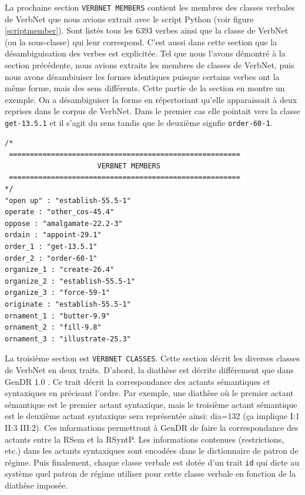 La prochaine section \texttt{VERBNET MEMBERS} contient les membres des classes verbales de VerbNet que nous avions extrait avec le script Python (voir figure \ref{scriptmember}). Sont listés tous les 6393 verbes ainsi que la classe de VerbNet (ou la sous-classe) qui leur correspond. C'est aussi dans cette section que la désambiguisation des verbes est explicitée. Tel que nous l'avons démontré à la section précédente, nous avions extraits les membres de classes de VerbNet, puis nous avons désambiuiser les formes identiques puisque certains verbes ont la même forme, mais des sens différents. Cette partie de la section en montre un exemple. On a désambiguiser la forme  en répertoriant qu'elle apparaissait à deux reprises dans le corpus de VerbNet. Dans le premier cas elle pointait vers la classe \texttt{get-13.5.1} et il s'agit du sens  tandis que le deuxième signfie  \texttt{order-60-1}.

\begin{lstlisting}[language=XML, caption = Partie membre du lexicon]
/*
 =======================================================
                      VERBNET MEMBERS
 =======================================================
*/
"open up" : "establish-55.5-1"
operate : "other_cos-45.4"
oppose : "amalgamate-22.2-3"
ordain : "appoint-29.1"
order_1 : "get-13.5.1"
order_2 : "order-60-1"
organize_1 : "create-26.4"
organize_2 : "establish-55.5-1"
organize_3 : "force-59-1"
originate : "establish-55.5-1"
ornament_1 : "butter-9.9"
ornament_2 : "fill-9.8"
ornament_3 : "illustrate-25.3"
\end{lstlisting}

La troisième section est \texttt{VERBNET CLASSES}. Cette section décrit les diverses classes de VerbNet en deux traits. D'abord, la diathèse est décrite différement que dans GenDR 1.0 . Ce trait décrit la correspondance des actants sémantiques et syntaxiques en précisant l'ordre. Par exemple, une diathèse où le premier actant sémantique est le premier actant syntaxique, mais le troisième actant sémantique est le deuxième actant syntaxique sera représentée ainsi:  dia=132 (ça implique I:1 II:3 III:2). Ces informations permettront à GenDR de faire la correspondance des actants entre la RSem et la RSyntP. Les informations contenues (restrictions, etc.) dans les actants syntaxiques sont encodées dans le dictionnaire de patron de régime. Puis finalement, chaque classe verbale est dotée d'un trait \texttt{id} qui dicte au système quel patron de régime utiliser pour cette classe verbale en fonction de la diathèse imposée.

